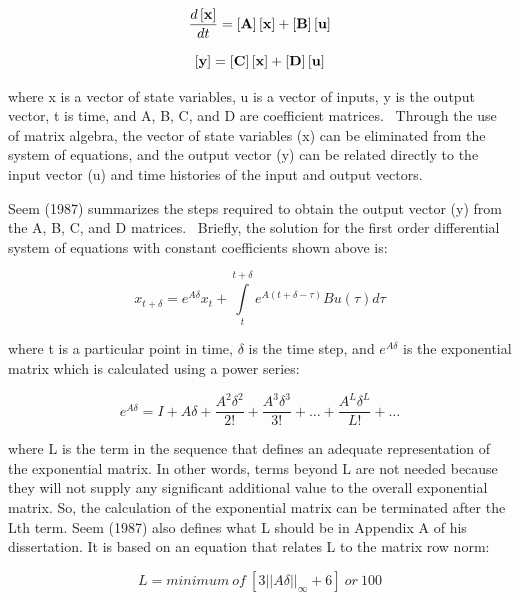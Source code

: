 \begin{equation}
\frac{{d\left[ {\bf{x}} \right]}}{{dt}} = \left[ {\bf{A}} \right]\left[ {\bf{x}} \right] + \left[ {\bf{B}} \right]\left[ {\bf{u}} \right]
\end{equation}

\begin{equation}
\left[ {\bf{y}} \right] = \left[ {\bf{C}} \right]\left[ {\bf{x}} \right] + \left[ {\bf{D}} \right]\left[ {\bf{u}} \right]
\end{equation}

where x is a vector of state variables, u is a vector of inputs, y is the output vector, t is time, and A, B, C, and D are coefficient matrices.~ Through the use of matrix algebra, the vector of state variables (x) can be eliminated from the system of equations, and the output vector (y) can be related directly to the input vector (u) and time histories of the input and output vectors.

Seem (1987) summarizes the steps required to obtain the output vector (y) from the A, B, C, and D matrices.~ Briefly, the solution for the first order differential system of equations with constant coefficients shown above is:

\begin{equation}
x_{t + \delta} = e^{A \delta} x_t + \int\limits_t^{t + \delta } {e^{A (t + \delta - \tau)} B u(\tau) d \tau}
\end{equation}

where t is a particular point in time, \(\delta\) is the time step, and \(e^{A \delta}\) is the exponential matrix which is calculated using a power series:

\begin{equation}
e^{A \delta} = I + A \delta + \frac{A^2 \delta ^ 2}{2!} + \frac{A^3 \delta ^ 3}{3!} + \ldots{} + \frac{A^L \delta ^ L}{L!} + \ldots{}
\end{equation}

where L is the term in the sequence that defines an adequate representation of the exponential matrix.  In other words, terms beyond L are not needed because they will not supply any significant additional value to the overall exponential matrix.  So, the calculation of the exponential matrix can be terminated after the Lth term.  Seem (1987) also defines what L should be in Appendix A of his dissertation.  It is based on an equation that relates L to the matrix row norm:

\begin{equation}
L = minimum~of~[3 ||A \delta||_\infty + 6]~or~100
\end{equation}

